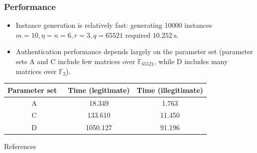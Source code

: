\documentclass[serif, hyperref={unicode, breaklinks}, xcolor={x11names, psnames,
  dvipsnames, table}, usepdftitle=false]{beamer}
\begin{document}
\begin{frame}
  \frametitle{Performance}
  \begin{itemize}
  \item Instance generation is relatively fast: generating \num{10000} instances
    $m = 10, \eta = n = 6, r = 3, q = 65521$ required $\SI{10.252}{\second}$.
  \item Authentication performance depends largely on the parameter set
    (parameter sets A and C include few matrices over $\mathbb{F}_{65521}$,
    while D includes many matrices over $\mathbb{F}_2$).
  \end{itemize}
  \begin{table}[h]
    \centering
    \begin{tabular}{c S S}
      \toprule
      Parameter set~\autocite{Cou01} & {Time (legitimate)}
      & {Time (illegitimate)} \\
      \midrule
      A & 18.349 & 1.763 \\
      C & 133.610 & 11.450 \\
      D & 1050.127 & 91.196 \\
      \bottomrule
    \end{tabular}
  \end{table}
\end{frame}

\begin{frame}{References}
  \printbibliography
\end{frame}
\end{document}
